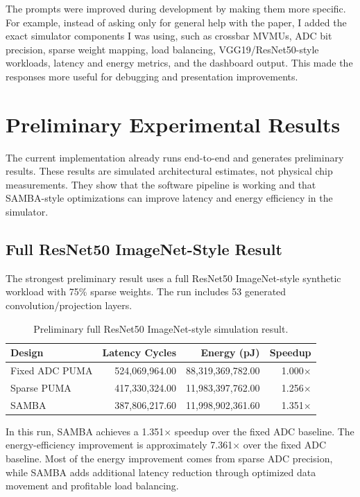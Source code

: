 \documentclass[11pt]{article}
\begin{document}
The prompts were improved during development by making them more specific. For example, instead of asking only for general help with the paper, I added the exact simulator components I was using, such as crossbar MVMUs, ADC bit precision, sparse weight mapping, load balancing, VGG19/ResNet50-style workloads, latency and energy metrics, and the dashboard output. This made the responses more useful for debugging and presentation improvements.

\section{Preliminary Experimental Results}

The current implementation already runs end-to-end and generates preliminary results. These results are simulated architectural estimates, not physical chip measurements. They show that the software pipeline is working and that SAMBA-style optimizations can improve latency and energy efficiency in the simulator.

\subsection{Full ResNet50 ImageNet-Style Result}

The strongest preliminary result uses a full ResNet50 ImageNet-style synthetic workload with 75\% sparse weights. The run includes 53 generated convolution/projection layers.

\begin{table}[H]
\centering
\caption{Preliminary full ResNet50 ImageNet-style simulation result.}
\begin{tabular}{lrrr}
\toprule
\textbf{Design} & \textbf{Latency Cycles} & \textbf{Energy (pJ)} & \textbf{Speedup} \\
\midrule
Fixed ADC PUMA & 524,069,964.00 & 88,319,369,782.00 & 1.000$\times$ \\
Sparse PUMA & 417,330,324.00 & 11,983,397,762.00 & 1.256$\times$ \\
SAMBA & 387,806,217.60 & 11,998,902,361.60 & 1.351$\times$ \\
\bottomrule
\end{tabular}
\end{table}

In this run, SAMBA achieves a 1.351$\times$ speedup over the fixed ADC baseline. The energy-efficiency improvement is approximately 7.361$\times$ over the fixed ADC baseline. Most of the energy improvement comes from sparse ADC precision, while SAMBA adds additional latency reduction through optimized data movement and profitable load balancing.
\end{document}
